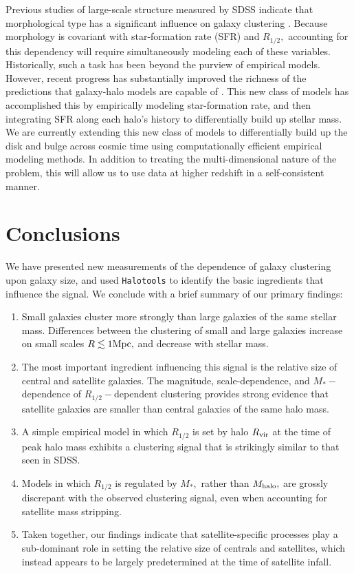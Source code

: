 \documentclass[usenatbib,usegraphicx,letterpaper]{mn2e}
\newcommand{\ben}{\begin{enumerate}}
\newcommand{\een}{\end{enumerate}}
\newcommand{\rhalf}{R_{1/2}}
\newcommand{\mstar}{M_{\ast}}
\newcommand{\mhalo}{M_{\rm halo}}
\newcommand{\rvir}{R_{\rm vir}}
\newcommand{\mpc}{{\rm Mpc}}
\begin{document}
Previous studies of large-scale structure measured by SDSS indicate that morphological type has a significant influence on galaxy clustering \citep{skibba_etal08}. Because morphology is covariant with star-formation rate (SFR) and $\rhalf,$ accounting for this dependency will require simultaneously modeling each of these variables. Historically, such a task has been beyond the purview of empirical models. However, recent progress has substantially improved the richness of the predictions that galaxy-halo models are capable of \citep{becker15,cohn17,moster_etal17}. This new class of models has accomplished this by empirically modeling star-formation rate, and then integrating SFR along each halo's history to differentially build up stellar mass. We are currently extending this new class of models to differentially build up the disk and bulge across cosmic time using computationally efficient empirical modeling methods. In addition to treating the multi-dimensional nature of the problem, this will allow us to use data at higher redshift in a self-consistent manner.

\section{Conclusions}
\label{sec:conclusion}

We have presented new measurements of the dependence of galaxy clustering upon galaxy size, and used {\tt Halotools} to identify the basic ingredients that influence the signal. We conclude with a brief summary of our primary findings:

\ben
\item Small galaxies cluster more strongly than large galaxies of the same stellar mass. Differences between the clustering of small and large galaxies increase on small scales $R\lesssim1\mpc,$ and decrease with stellar mass.
\item The most important ingredient influencing this signal is the relative size of central and satellite galaxies. The magnitude, scale-dependence, and $\mstar-$dependence of $\rhalf-$dependent clustering provides strong evidence that satellite galaxies are smaller than central galaxies of the same halo mass.
\item A simple empirical model in which $\rhalf$ is set by halo $\rvir$ at the time of peak halo mass exhibits a clustering signal that is strikingly similar to that seen in SDSS.
\item Models in which $\rhalf$ is regulated by $\mstar,$ rather than $\mhalo,$ are grossly discrepant with the observed clustering signal, even when accounting for satellite mass stripping.
\item Taken together, our findings indicate that satellite-specific processes play a sub-dominant role in setting the relative size of centrals and satellites, which instead appears to be largely predetermined at the time of satellite infall.
\een
\end{document}
